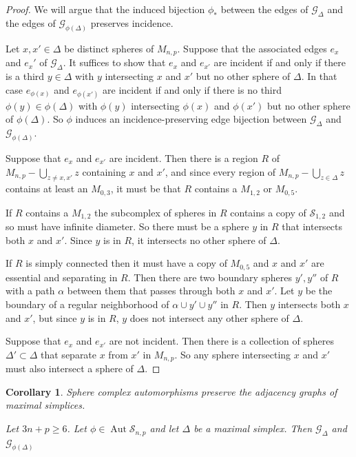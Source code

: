 \documentclass[11pt]{article}
\DeclareMathOperator{\aaut}{Aut}
\newtheorem{corollary}[theorem]{Corollary}
\theoremstyle{remark}
\theoremstyle{definition}
\begin{document}
\begin{proof}
  We will argue that the induced bijection  $\phi_\ast$
  between the edges of $\mathcal G_\Delta$ and the edges of $\mathcal G_{\phi(\Delta)}$ preserves incidence.

  Let $x,x' \in \Delta$ be distinct spheres of $M_{n,p}$.
  Suppose that the associated edges $e_x$ and $e_x'$
  of $\mathcal G_\Delta$.
  It suffices to show that $e_x$ and $e_{x'}$ are incident if and only if there is a third $y \in \Delta$ with $y$
  intersecting $x$ and $x'$ but no other sphere of $\Delta$.
  In that case $e_{\phi(x)}$ and $e_{\phi(x')}$ are incident if and only if there is no third $\phi(y) \in \phi(\Delta)$ with $\phi(y)$
  intersecting $\phi(x)$ and $\phi(x')$ but no other sphere of $\phi(\Delta)$.
  So $\phi$ induces an incidence-preserving edge bijection between $\mathcal G_\Delta$ and $\mathcal G_{\phi(\Delta)}$.

  Suppose that $e_x$ and $e_{x'}$ are incident.
  Then there is a region $R$ of $M_{n,p}-\bigcup_{z \neq x,x'}z$
  containing $x$ and $x'$, and since every region of
  $M_{n,p}-\bigcup_{z \in \Delta}z$ contains at least an $M_{0,3}$,
  it must be that $R$ contains a $M_{1,2}$ or $M_{0,5}$.

  If $R$ contains a $M_{1,2}$ the subcomplex of spheres in $R$ contains a copy of $\mathcal S_{1,2}$ and so must have infinite diameter. So there must be a sphere $y$ in $R$ that intersects both $x$ and $x'$. Since $y$ is in $R$, it intersects no other sphere of $\Delta$.

  If $R$ is simply connected then it must have a copy of $M_{0,5}$
  and $x$ and $x'$ are essential and separating in $R$.
  Then there are two boundary spheres $y',y''$ of $R$ with a path $\alpha$ between them that passes through both $x$ and $x'$. Let $y$ be the boundary of a regular neighborhood of $\alpha \cup y' \cup y''$ in $R$. Then $y$ intersects both $x$ and $x'$, but since $y$ is in $R$, $y$ does not intersect any other sphere of $\Delta$.

  Suppose that $e_x$ and $e_{x'}$ are not incident.
  Then there is a collection of spheres $\Delta' \subset \Delta$
  that separate $x$ from $x'$ in $M_{n,p}$.
  So any sphere intersecting $x$ and $x'$ must also intersect a sphere of $\Delta$.
\end{proof}



\begin{corollary}
  Sphere complex automorphisms preserve the adjacency graphs of maximal simplices.

  Let $3n+p\geq 6$.
  Let $\phi \in \aaut \mathcal S_{n,p}$ and let $\Delta$ be a maximal simplex. Then $\mathcal G_\Delta$ and $\mathcal G_{\phi(\Delta)}$
  \label{lemma:outadjgraph}
\end{corollary}
\end{document}

